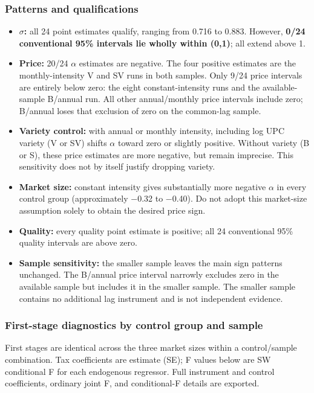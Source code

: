 \documentclass[10pt,]{article}
\providecommand{\tightlist}{%
  \setlength{\itemsep}{0pt}\setlength{\parskip}{0pt}}
\begin{document}
\subsubsection{Patterns and
qualifications}\label{patterns-and-qualifications}

\begin{itemize}
\tightlist
\item
  \textbf{\(\sigma\):} all 24 point estimates qualify, ranging from
  0.716 to 0.883. However, \textbf{0/24 conventional 95\% intervals lie
  wholly within (0,1)}; all extend above 1.
\item
  \textbf{Price:} 20/24 \(\alpha\) estimates are negative. The four
  positive estimates are the monthly-intensity V and SV runs in both
  samples. Only 9/24 price intervals are entirely below zero: the eight
  constant-intensity runs and the available-sample B/annual run. All
  other annual/monthly price intervals include zero; B/annual loses that
  exclusion of zero on the common-lag sample.
\item
  \textbf{Variety control:} with annual or monthly intensity, including
  log UPC variety (V or SV) shifts \(\alpha\) toward zero or slightly
  positive. Without variety (B or S), these price estimates are more
  negative, but remain imprecise. This sensitivity does not by itself
  justify dropping variety.
\item
  \textbf{Market size:} constant intensity gives substantially more
  negative \(\alpha\) in every control group (approximately −0.32 to
  −0.40). Do not adopt this market-size assumption solely to obtain the
  desired price sign.
\item
  \textbf{Quality:} every quality point estimate is positive; all 24
  conventional 95\% quality intervals are above zero.
\item
  \textbf{Sample sensitivity:} the smaller sample leaves the main sign
  patterns unchanged. The B/annual price interval narrowly excludes zero
  in the available sample but includes it in the smaller sample. The
  smaller sample contains no additional lag instrument and is not
  independent evidence.
\end{itemize}

\subsubsection{First-stage diagnostics by control group and
sample}\label{first-stage-diagnostics-by-control-group-and-sample}

First stages are identical across the three market sizes within a
control/sample combination. Tax coefficients are estimate (SE); F values
below are SW conditional F for each endogenous regressor. Full
instrument and control coefficients, ordinary joint F, and conditional-F
details are exported.
\end{document}
